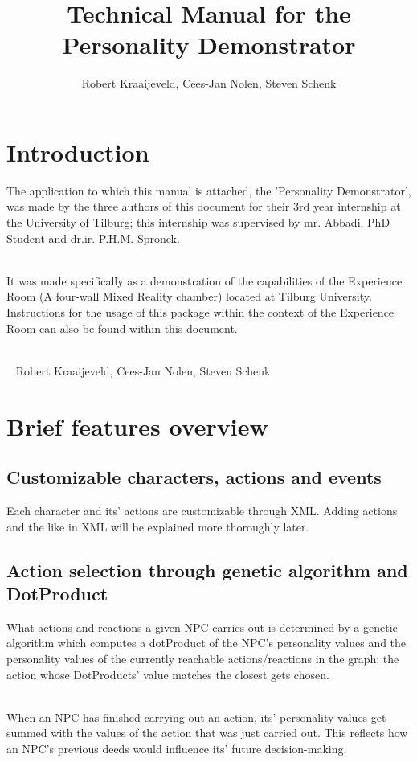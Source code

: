 \documentclass[11pt]{article} %
\title{Technical Manual for the Personality Demonstrator}
\author{Robert Kraaijeveld, Cees-Jan Nolen, Steven Schenk}
\begin{document}
\maketitle

\newpage
\tableofcontents
\newpage

\section{Introduction}
The application to which this manual is attached, the 'Personality Demonstrator', was made by the three authors of this document for their 3rd year internship at the University of Tilburg; this internship was supervised by mr. Abbadi, PhD Student and dr.ir. P.H.M.  Spronck.

~\\
It was made specifically as a demonstration of the capabilities of the  Experience Room (A four-wall Mixed Reality chamber) located at Tilburg University. Instructions for the usage of this package within the context of the Experience Room can also be found within this document.

~\\
~ Robert Kraaijeveld, Cees-Jan Nolen, Steven Schenk


\newpage
\section{Brief features overview}
\subsection{Customizable characters, actions and events}
Each character and its' actions are customizable through XML. Adding actions and the like in XML will be explained more thoroughly later.

\subsection{Action selection through genetic algorithm and DotProduct}
What actions and reactions a given NPC carries out is determined by a genetic algorithm which computes a dotProduct of the NPC's personality values and the personality values of the currently reachable actions/reactions in the graph; the action whose DotProducts' value matches the closest gets chosen. 

~\\
When an NPC has finished carrying out an action, its' personality values get summed with the values of the action that was just carried out. This reflects how an NPC's previous deeds would influence its' future decision-making. 
\end{document}
